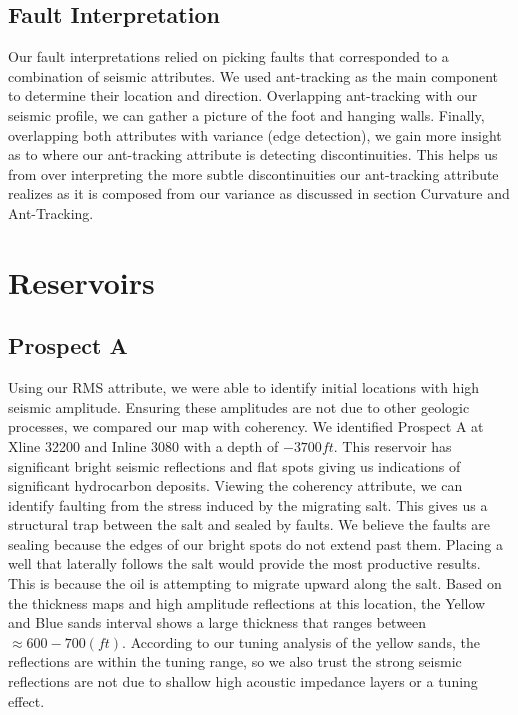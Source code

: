 \documentclass[fleqn]{article}
\begin{document}
\subsection{Fault Interpretation}

Our fault interpretations relied on picking faults that corresponded to a combination of seismic attributes. We used ant-tracking as the main component to determine their location and direction. Overlapping ant-tracking with our seismic profile, we can gather a picture of the foot and hanging walls. Finally, overlapping both attributes with variance (edge detection), we gain more insight as to where our ant-tracking attribute is detecting discontinuities. This helps us from over interpreting the more subtle discontinuities our ant-tracking attribute realizes as it is composed from our variance as discussed in section Curvature and Ant-Tracking.

\section{Reservoirs}
\subsection{Prospect A}

Using our RMS attribute, we were able to identify initial locations with high seismic amplitude. Ensuring these amplitudes are not due to other geologic processes, we compared our map with coherency. We identified Prospect A at Xline 32200 and Inline 3080 with a depth of $-3700ft$. This reservoir has significant bright seismic reflections and flat spots giving us indications of significant hydrocarbon deposits. Viewing the coherency attribute, we can identify faulting from the stress induced by the migrating salt. This gives us a structural trap between the salt and sealed by faults. We believe the faults are sealing because the edges of our bright spots do not extend past them. Placing a well that laterally follows the salt would provide the most productive results. This is because the oil is attempting to migrate upward along the salt. Based on the thickness maps and high amplitude reflections at this location, the Yellow and Blue sands interval shows a large thickness that ranges between $\approx 600 - 700 (ft)$. According to our tuning analysis of the yellow sands, the reflections are within the tuning range, so we also trust the strong seismic reflections are not due to shallow high acoustic impedance layers or a tuning effect.
\end{document}
